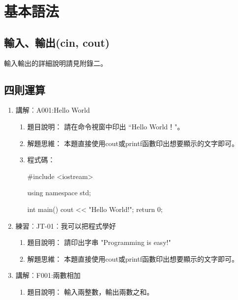 \section{基本語法}

	\subsection{輸入、輸出(cin, cout)}
	輸入輸出的詳細說明請見附錄二。
	\subsection{四則運算}
	
\begin{enumerate}
	\item 講解︰A001:Hello World
	\begin{enumerate}
	\item 題目說明：
	\subitem 請在命令視窗中印出 ``Hello World！"。
	
	\item 解題思維：
	\subitem 本題直接使用cout或printf函數印出想要顯示的文字即可。
	
	\item 程式碼：
	\begin{cppcode}
		#include <iostream>
		
		using namespace std;
		
		int main()
		{
			cout << "Hello World!";
			return 0;
		}
	\end{cppcode}
	\end{enumerate}
	
	\item 練習︰JT-01︰我可以把程式學好
		\begin{enumerate}
			\item 題目說明：
			\subitem 請印出字串 "Programming is easy!"
			
			\item 解題思維：
			\subitem 本題直接使用cout或printf函數印出想要顯示的文字即可。
\begin{comment}			
			\item 程式碼：
			\begin{cppcode}
				#include <iostream>
				
				using namespace std;
				
				int main()
				{
					cout << "Programming is easy!";
					return 0;
				}
				
			\end{cppcode}
\end{comment}
		\end{enumerate}
	\item 講解︰F001:兩數相加%
		\begin{enumerate}
			\item 題目說明：
			\subitem 輸入兩整數，輸出兩數之和。
			

\end{enumerate}
\end{enumerate}
